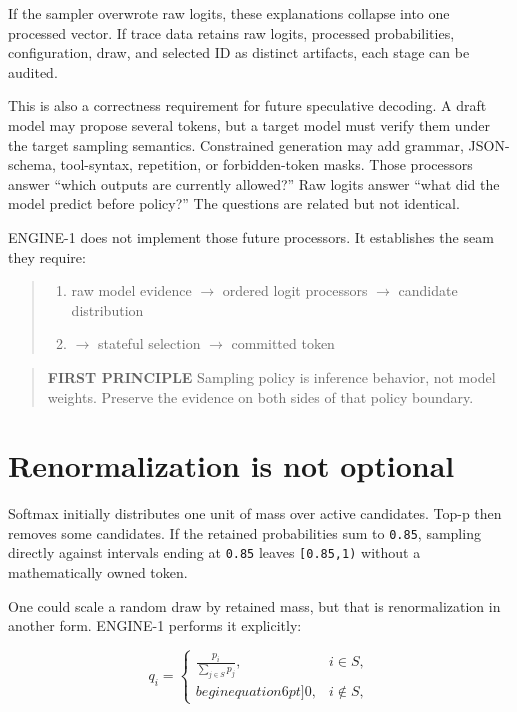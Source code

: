 If the sampler overwrote raw logits, these explanations collapse into
one processed vector. If trace data retains raw logits, processed
probabilities, configuration, draw, and selected ID as distinct
artifacts, each stage can be audited.

This is also a correctness requirement for future speculative decoding.
A draft model may propose several tokens, but a target model must verify
them under the target sampling semantics. Constrained generation may add
grammar, JSON-schema, tool-syntax, repetition, or forbidden-token masks.
Those processors answer ``which outputs are currently allowed?'' Raw
logits answer ``what did the model predict before policy?'' The
questions are related but not identical.

ENGINE-1 does not implement those future processors. It establishes the
seam they require:

\begin{quote}
\begin{enumerate}
\item raw model evidence  \(\longrightarrow\)  ordered logit processors  \(\longrightarrow\)  candidate distribution
\item \(\longrightarrow\)  stateful selection  \(\longrightarrow\)  committed token
\end{enumerate}
\end{quote}

\begin{quote}
\textbf{FIRST PRINCIPLE} Sampling policy is inference behavior, not
model weights. Preserve the evidence on both sides of that policy
boundary.
\end{quote}

\section{Renormalization is not
optional}\label{renormalization-is-not-optional}

Softmax initially distributes one unit of mass over active candidates.
Top-p then removes some candidates. If the retained probabilities sum to
\texttt{0.85}, sampling directly against intervals ending at
\texttt{0.85} leaves \texttt{{[}0.85,1)} without a mathematically owned
token.

One could scale a random draw by retained mass, but that is
renormalization in another form. ENGINE-1 performs it explicitly:

\begin{equation}
q_i=
\begin{cases}
\displaystyle\frac{p_i}{\sum_{j\in S}p_j}, & i\in S,\\begin{equation}6pt]
0, & i\notin S,
\end{cases}
\end{equation}

